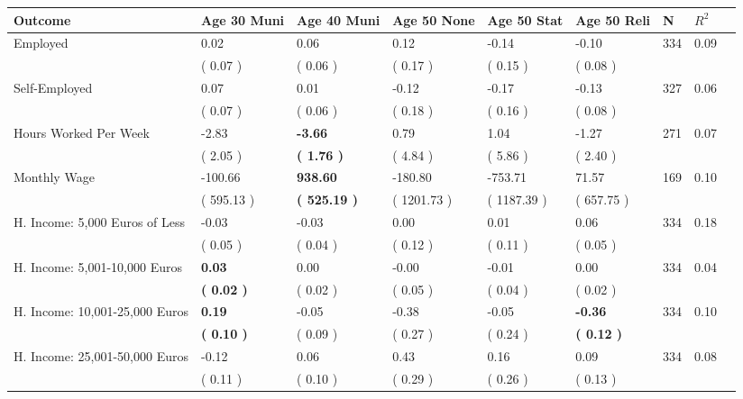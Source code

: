 \begin{tabular}{L{6.2cm} C{1.8cm} C{1.8cm} C{1.8cm} C{1.8cm} C{1.8cm} C{1.8cm} C{0.3cm} C{0.3cm}}
\toprule
 \textbf{Outcome} & \textbf{Age 30 Muni} & \textbf{Age 40 Muni} & \textbf{Age 50 None} & \textbf{Age 50 Stat} & \textbf{Age 50 Reli} & \textbf{N} & \textbf{$ R^2$} \\
\midrule
Employed &      0.02 &      0.06 &      0.12 &     -0.14 &     -0.10  & 334 &       0.09 \\ 
 & (     0.07 ) & (     0.06 ) & (     0.17 ) & (     0.15 ) & (     0.08 )  & \\
Self-Employed &      0.07 &      0.01 &     -0.12 &     -0.17 &     -0.13  & 327 &       0.06 \\ 
 & (     0.07 ) & (     0.06 ) & (     0.18 ) & (     0.16 ) & (     0.08 )  & \\
Hours Worked Per Week &     -2.83 & \textbf{    -3.66} &      0.79 &      1.04 &     -1.27  & 271 &       0.07 \\ 
 & (     2.05 ) & \textbf{(     1.76 )} & (     4.84 ) & (     5.86 ) & (     2.40 )  & \\
Monthly Wage &   -100.66 & \textbf{   938.60} &   -180.80 &   -753.71 &     71.57  & 169 &       0.10 \\ 
 & (   595.13 ) & \textbf{(   525.19 )} & (  1201.73 ) & (  1187.39 ) & (   657.75 )  & \\
H. Income: 5,000 Euros of Less &     -0.03 &     -0.03 &      0.00 &      0.01 &      0.06  & 334 &       0.18 \\ 
 & (     0.05 ) & (     0.04 ) & (     0.12 ) & (     0.11 ) & (     0.05 )  & \\
H. Income: 5,001-10,000 Euros & \textbf{     0.03} &      0.00 &     -0.00 &     -0.01 &      0.00  & 334 &       0.04 \\ 
 & \textbf{(     0.02 )} & (     0.02 ) & (     0.05 ) & (     0.04 ) & (     0.02 )  & \\
H. Income: 10,001-25,000 Euros & \textbf{     0.19} &     -0.05 &     -0.38 &     -0.05 & \textbf{    -0.36}  & 334 &       0.10 \\ 
 & \textbf{(     0.10 )} & (     0.09 ) & (     0.27 ) & (     0.24 ) & \textbf{(     0.12 )}  & \\
H. Income: 25,001-50,000 Euros &     -0.12 &      0.06 &      0.43 &      0.16 &      0.09  & 334 &       0.08 \\ 
 & (     0.11 ) & (     0.10 ) & (     0.29 ) & (     0.26 ) & (     0.13 )  & \\

\end{tabular}
